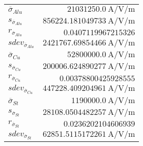 
{%
    \begin{center}
    \label{tab:errorAnalysis}
    \begin{tabular}{lr}
    \toprule
        $\overline{\sigma}_{Alu}    $ & $\SI{21031250.0}{\ampere\per\volt\per\meter}$ \\
        $s_{\overline{\sigma}_{Alu}}$ & $\SI{856224.181049733}{\ampere\per\volt\per\meter}$ \\
        $r_{\overline{\sigma}_{Alu}}$ & $\num{0.0407119967215326}$ \\
        $sdev_{\overline{\sigma}_{Alu}}$ & $\SI{2421767.69854466}{\ampere\per\volt\per\meter}$ \\
        $\overline{\sigma}_{Cu}     $ & $\SI{52800000.0}{\ampere\per\volt\per\meter}$ \\
        $s_{\overline{\sigma}_{Cu}} $ & $\SI{200006.624890277}{\ampere\per\volt\per\meter}$ \\
        $r_{\overline{\sigma}_{Cu}} $ & $\num{0.00378800425928555}$ \\
        $sdev_{\overline{\sigma}_{Cu}} $ & $\SI{447228.409204961}{\ampere\per\volt\per\meter}$ \\
        $\overline{\sigma}_{St}     $ & $\SI{1190000.0}{\ampere\per\volt\per\meter}$ \\
        $s_{\overline{\sigma}_{St}} $ & $\SI{28108.0504482257}{\ampere\per\volt\per\meter}$ \\
        $r_{\overline{\sigma}_{St}} $ & $\num{0.0236202104606939}$ \\
        $sdev_{\overline{\sigma}_{St}} $ & $\SI{62851.5115172261}{\ampere\per\volt\per\meter}$ \\

    \bottomrule
    \end{tabular}
    \end{center}
}
